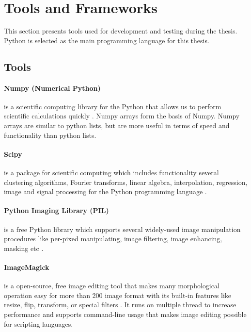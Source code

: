 \section{Tools and Frameworks}

    This section presents tools used for development and testing during the thesis. Python is selected as the main programming language for this thesis.

    \subsection{Tools}

        \paragraph{Numpy (Numerical Python)} is a scientific computing library for the Python that allows us
            to perform scientific calculations quickly \cite{oliphant2006guide}. Numpy arrays form the basis of Numpy.
            Numpy arrays are similar to python lists, but are more useful in terms of speed and functionality than python lists.

        \paragraph{Scipy} is a package for scientific computing which includes functionality several clustering algorithms,
            Fourier transforms, linear algebra, interpolation, regression, image and signal processing for the Python programming language \cite{virtanen2020scipy}.

        \paragraph{Python Imaging Library (PIL)} is a free Python library which supports several widely-used image manipulation procedures
            like per-pixed manipulating, image filtering, image enhancing, masking etc \cite{anjal2019roi}.

        \paragraph{ImageMagick} is a open-source, free image editing tool that makes many morphological operation easy
            for more than 200 image format with its built-in features like resize, flip, transform, or special filters \cite{ImageMag68online}.
            It runs on multiple thread to increase performance and supports command-line usage that makes image editing possible for scripting languages.

